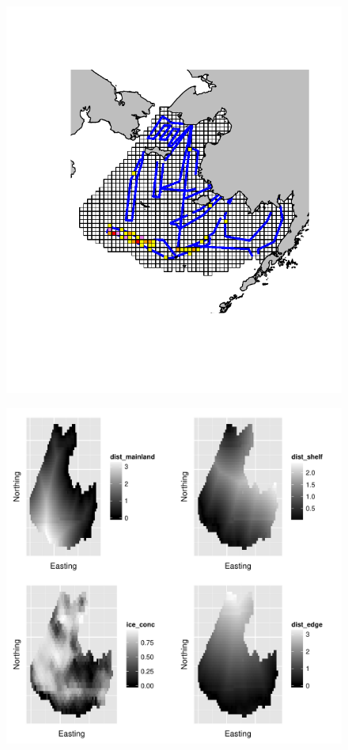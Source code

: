 \documentclass[12pt,english]{article}
\begin{document}
\begin{spacing}{1.9}
\begin{figure}[!h]
\begin{center}
\includegraphics[width=6in]{test_flights_optimized.pdf}
\end{center}
\caption{ }
\label{fig:flights}
\end{figure}

\begin{figure}[!h]
\begin{center}
\includegraphics[width=6in]{covariates.pdf}
\end{center}
\caption{ }
\label{fig:covs}
\end{figure}


\end{spacing}
\end{document}
